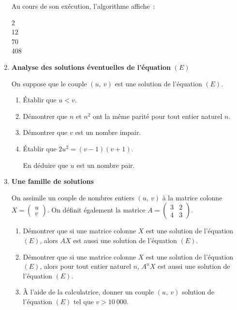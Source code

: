 \begin{enumerate}
\begin{center}
          \end{center}
Au cours de son exécution, l'algorithme affiche~:\\
\begin{indent}
                   2 \\
                    12 \\
                   70 \\
                   408 \\
\end{indent}
          \item \textbf{Analyse des solutions éventuelles de l'équation }$(E)$
          \par
          On suppose que le couple $(u,~v)$ est une solution de l'équation $(E)$.
          \begin{enumerate}[label=\alph*.]
               \item Établir que $u < v$.
               \item  Démontrer que $n$ et $n^2$ ont la même parité pour tout entier naturel $n$.
               \item  Démontrer que $v$ est un nombre impair.
               \item  Établir que $2u^2 =(v-1)(v+1)$.
               \par
               En déduire que $u$ est un nombre pair.
          \end{enumerate}
          \item \textbf{ Une famille de solutions}
          \par
          On assimile un couple de nombres entiers $(u,~v)$ à la matrice colonne $X = \begin{pmatrix}u\\v\end{pmatrix}.$
          On définit également la matrice $A = \begin{pmatrix}3&2\\4&3\end{pmatrix}$.
          \begin{enumerate}[label=\alph*.]
               \item Démontrer que si une matrice colonne $X$ est une solution de l'équation $(E)$, alors $AX$ est aussi une solution de l'équation $(E)$.
               \item Démontrer que si une matrice colonne $X$ est une solution de l'équation $(E)$, alors pour tout entier naturel $n$,\: $A^n X$ est aussi une solution de l'équation $(E)$.
               \item À l'aide de la calculatrice, donner un couple $(u,~v)$ solution de l'équation $(E)$ tel que $v > 10~000$.
          \end{enumerate}
     \end{enumerate}
